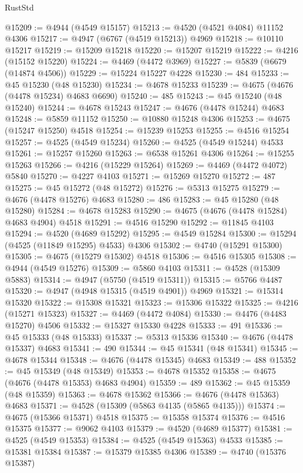 \begin{lexlean}{RustStd}
\begin{coremodule}
{\begin{coremodule}
{{{{{{{{{{{{{{{{{{{{{{{{{{{{{{{{{{{{{{{{{{{{{{{{{{{{{{{{{{{{@15209 := @4944 (@4549 @15157)
@15213 := @4520 (@4521 @4084) @11152 @4306
@15217 := @4947 (@6767 (@4519 @15213)) @4969
@15218 := @10110 @15217
@15219 := @15209 @15218
@15220 := @15207 @15219
@15222 := @4216 (@15152 @15220)
@15224 := @4469 (@4472 @3969)
@15227 := @5839 (@6679 (@14874 @4506))
@15229 := @15224 @15227 @4228
@15230 := 484
@15233 := @45 @15230 (@48 @15230)
@15234 := @4678 @15233
@15239 := @4675 (@4676 (@4478 @15234) @4683 @6690)
@15240 := 485
@15243 := @45 @15240 (@48 @15240)
@15244 := @4678 @15243
@15247 := @4676 (@4478 @15244) @4683
@15248 := @5859 @11152
@15250 := @10880 @15248 @4306
@15253 := @4675 (@15247 @15250) @4518
@15254 := @15239 @15253
@15255 := @4516 @15254
@15257 := @4525 (@4549 @15234)
@15260 := @4525 (@4549 @15244) @4533
@15261 := @15257 @15260
@15263 := @6538 @15261 @4306
@15264 := @15255 @15263
@15266 := @4216 (@15229 @15264)
@15269 := @4469 (@4472 @4072) @5840
@15270 := @4227 @4103
@15271 := @15269 @15270
@15272 := 487
@15275 := @45 @15272 (@48 @15272)
@15276 := @5313 @15275
@15279 := @4676 (@4478 @15276) @4683
@15280 := 486
@15283 := @45 @15280 (@48 @15280)
@15284 := @4678 @15283
@15290 := @4675 (@4676 (@4478 @15284) @4683 @4904) @4518
@15291 := @4516 @15290
@15292 := @11845 @4103
@15294 := @4520 (@4689 @15292)
@15295 := @4549 @15284
@15300 := @15294 (@4525 (@11849 @15295) @4533) @4306
@15302 := @4740 (@15291 @15300)
@15305 := @4675 (@15279 @15302) @4518
@15306 := @4516 @15305
@15308 := @4944 (@4549 @15276)
@15309 := @5860 @4103
@15311 := @4528 (@15309 @5883)
@15314 := @4947 (@5750 (@4519 @15311))
@15315 := @5766 @4487
@15320 := @4947 (@4948 @15315 (@4519 @4901)) @4969
@15321 := @15314 @15320
@15322 := @15308 @15321
@15323 := @15306 @15322
@15325 := @4216 (@15271 @15323)
@15327 := @4469 (@4472 @4084)
@15330 := @4476 (@4483 @15270) @4506
@15332 := @15327 @15330 @4228
@15333 := 491
@15336 := @45 @15333 (@48 @15333)
@15337 := @5313 @15336
@15340 := @4676 (@4478 @15337) @4683
@15341 := 490
@15344 := @45 @15341 (@48 @15341)
@15345 := @4678 @15344
@15348 := @4676 (@4478 @15345) @4683
@15349 := 488
@15352 := @45 @15349 (@48 @15349)
@15353 := @4678 @15352
@15358 := @4675 (@4676 (@4478 @15353) @4683 @4904)
@15359 := 489
@15362 := @45 @15359 (@48 @15359)
@15363 := @4678 @15362
@15366 := @4676 (@4478 @15363) @4683
@15371 := @4528 (@15309 (@5863 @4135 (@5865 @4135)))
@15374 := @4675 (@15366 @15371) @4518
@15375 := @15358 @15374
@15376 := @4516 @15375
@15377 := @9062 @4103
@15379 := @4520 (@4689 @15377)
@15381 := @4525 (@4549 @15353)
@15384 := @4525 (@4549 @15363) @4533
@15385 := @15381 @15384
@15387 := @15379 @15385 @4306
@15389 := @4740 (@15376 @15387)
}}}}}}}}}}}}}}}}}}}}}}}}}}}}}}}}}}}}}}}}}}}}}}}}}}}}}}}}}}}}
\end{coremodule}}
\end{coremodule}
\end{lexlean}

